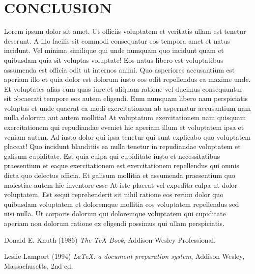 \documentclass[a4paper,12pt]{report}
\begin{document}
\newpage

\chapter{CONCLUSION}
\hspace{.5cm}  
Lorem ipsum dolor sit amet. Ut officiis voluptatem et veritatis ullam est tenetur deserunt. A illo facilis sit commodi consequatur eos tempora amet et natus incidunt. Vel minima similique qui unde numquam quo incidunt quam et quibusdam quia sit voluptas voluptate! Eos natus libero est voluptatibus assumenda est officia odit ut internos animi. Quo asperiores accusantium est aperiam illo et quia dolor est dolorum iusto eos odit repellendus ea maxime unde. Et voluptates alias eum quas iure et aliquam ratione vel ducimus consequuntur sit obcaecati tempore eos autem eligendi. Eum numquam libero nam perspiciatis voluptas et unde quaerat ea modi exercitationem ab aspernatur accusantium nam nulla dolorum aut autem mollitia! At voluptatum exercitationem nam quisquam exercitationem qui repudiandae eveniet hic aperiam illum et voluptatem ipsa et veniam autem. Ad iusto dolor qui ipsa tenetur qui sunt explicabo quo voluptatem placeat! Quo incidunt blanditiis ea nulla tenetur in repudiandae voluptatem et galisum cupiditate. Est quia culpa qui cupiditate iusto et necessitatibus praesentium et eaque exercitationem est exercitationem repellendus qui omnis dicta quo delectus officia. Et galisum mollitia et assumenda praesentium quo molestiae autem hic inventore esse At iste placeat vel expedita culpa ut dolor voluptatem. Est sequi reprehenderit sit nihil ratione eos rerum dolor quo quibusdam voluptatem et doloremque mollitia eos voluptatem repellendus sed nisi nulla. Ut corporis dolorum qui doloremque voluptatem qui cupiditate aperiam non dolorum ratione ex eligendi possimus qui ullam perspiciatis.

\newpage

\begin{thebibliography}{9}
Donald E. Knuth (1986) \emph{The \TeX{} Book}, Addison-Wesley Professional.

Leslie Lamport (1994) \emph{\LaTeX: a document preparation system}, Addison
Wesley, Massachusetts, 2nd ed.
\end{thebibliography}
\end{document}
